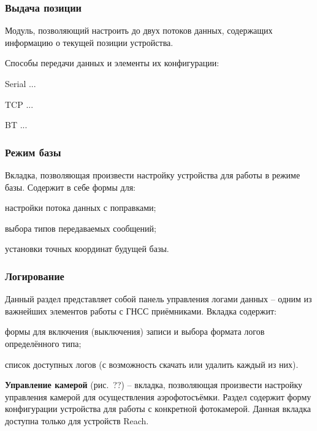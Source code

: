\subsubsection{Выдача позиции}

Модуль, позволяющий настроить до двух потоков данных, содержащих информацию о текущей позиции устройства.

Способы передачи данных и элементы их конфигурации:
\begin{dashitemize}
  \item Serial ...
  \item TCP ...
  \item BT ...
\end{dashitemize}

\subsubsection{Режим базы}

Вкладка, позволяющая произвести настройку устройства для работы в режиме базы. Содержит в себе формы для:
\begin{dashitemize}
  \item настройки потока данных с поправками;
  \item выбора типов передаваемых сообщений;
  \item установки точных координат будущей базы.
\end{dashitemize}

\subsubsection{Логирование}

Данный раздел представляет собой панель управления логами данных -- одним из важнейших элементов работы с ГНСС приёмниками. Вкладка содержит:
\begin{dashitemize}
  \item формы для включения (выключения) записи и выбора формата логов определённого типа;
  \item список доступных логов (с возможность скачать или удалить каждый из них).
\end{dashitemize}

\textbf{Управление камерой} (рис.~??) -- вкладка, позволяющая произвести настройку управления камерой для осуществления аэрофотосъёмки. Раздел содержит форму конфигурации устройства для работы с конкретной фотокамерой. Данная вкладка доступна только для устройств Reach.

